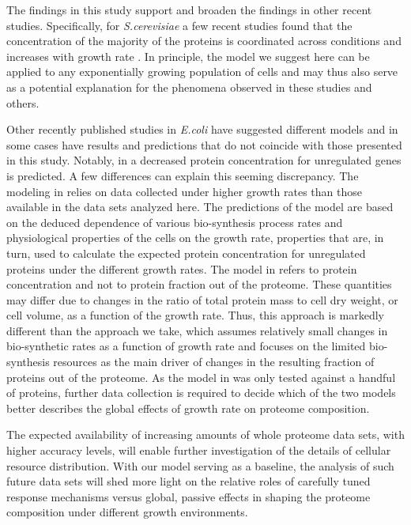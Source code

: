 \documentclass{article}
\begin{document}
The findings in this study support and broaden the findings in other recent studies.
Specifically, for \emph{S.cerevisiae} a few recent studies found that the concentration of the majority of the proteins is coordinated across conditions and increases with growth rate \cite{Keren2013a,Gasch2000,Brauer2008a}.
In principle, the model we suggest here can be applied to any exponentially growing population of cells and may thus also serve as a potential explanation for the phenomena observed in these studies and others.

Other recently published studies in \emph{E.coli} have suggested different models and in some cases have results  and predictions that do not coincide with those presented in this study.
Notably, in \cite{Klumpp2009,Klumpp2014} a decreased protein concentration for unregulated genes is predicted.
A few differences can explain this seeming discrepancy.
The modeling in \cite{Klumpp2009} relies on data collected under higher growth rates than those available in the data sets analyzed here.
The predictions of the model are based on the deduced dependence of various bio-synthesis process rates and physiological properties of the cells on the growth rate, properties that are, in turn, used to calculate the expected protein concentration for unregulated proteins under the different growth rates.
The model in \cite{Klumpp2009} refers to protein concentration and not to protein fraction out of the proteome. These quantities may differ due to changes in the ratio of total protein mass to cell dry weight, or cell volume, as a function of the growth rate.
Thus, this approach is markedly different than the approach we take, which assumes relatively small changes in bio-synthetic rates as a function of growth rate and focuses on the limited bio-synthesis resources as the main driver of changes in the resulting fraction of proteins out of the proteome.
As the model in \cite{Klumpp2009} was only tested against a handful of proteins, further data collection is required to decide which of the two models better describes the global effects of growth rate on proteome composition.

The expected availability of increasing amounts of whole proteome data sets, with higher accuracy levels, will enable further investigation of the details of cellular resource distribution.
With our model serving as a baseline, the analysis of such future data sets will shed more light on the relative roles of carefully tuned response mechanisms versus global, passive effects in shaping the proteome composition under different growth environments.
\end{document}
